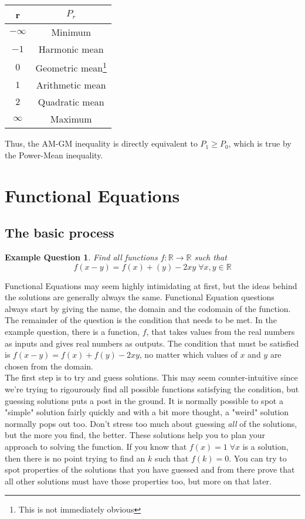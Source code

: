 \documentclass[a4paper,12pt]{article}
\newtheorem{example}{Example Question}
\begin{document}
\begin{table}[]
    \centering
\begin{tabular}{|c|c|}
\hline
r                         & $P_r$            \\
\hline
$-\infty$                 & Minimum         \\
\hline
$-1$                      & Harmonic mean   \\
\hline
$0$                       & Geometric mean\footnote{This is not immediately obvious}  \\
\hline
$1$                       & Arithmetic mean \\
\hline
$2$                       & Quadratic mean  \\
\hline
$\infty$                  & Maximum \\
\hline       
\end{tabular}
\end{table}

Thus, the AM-GM inequality is directly equivalent to $P_1 \geq P_0$, which is true by the Power-Mean inequality.

\section{Functional Equations}
\subsection{The basic process}
\begin{example}
    Find all functions $f: \mathbb{R} \rightarrow \mathbb{R}$ such that $$f(x - y) = f(x) + (y) - 2xy\; \forall x, y \in \mathbb{R}$$
\end{example}

Functional Equations may seem highly intimidating at first, but the ideas behind the solutions are generally always the same.
Functional Equation questions always start by giving the name, the domain and the codomain of the function. The remainder of the question is the condition that needs to be met.
In the example question, there is a function, $f$, that takes values from the real numbers as inputs and gives real numbers as outputs. The condition that must be satisfied is $f(x - y) = f(x) + f(y) - 2xy$, no matter which values of $x$ and $y$ are chosen from the domain. \\

The first step is to try and guess solutions. This may seem counter-intuitive since we're trying to rigourously find all possible functions satisfying the condition, but guessing solutions puts a post in the ground. It is normally possible to spot a "simple" solution fairly quickly and with a bit more thought, a "weird" solution normally pops out too.
Don't stress too much about guessing \emph{all} of the solutions, but the more you find, the better. These solutions help you to plan your approach to solving the function. If you know that $f(x) = 1\; \forall x$ is a solution, then there is no point trying to find an $k$ such that $f(k) = 0$.
You can try to spot properties of the solutions that you have guessed and from there prove that all other solutions must have those properties too, but more on that later.\\
\end{document}
